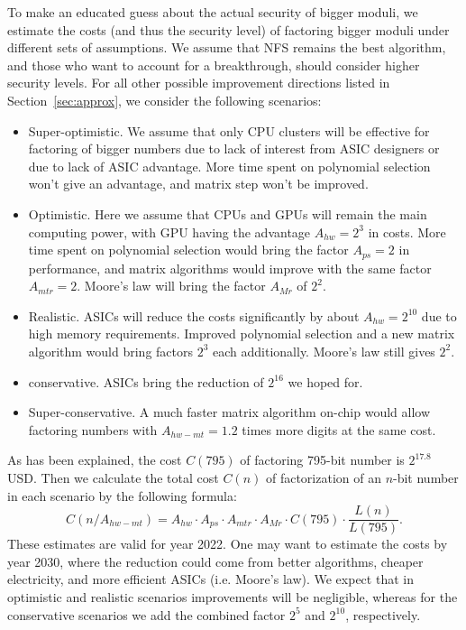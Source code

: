 \documentclass[a4paper]{article}
\begin{document}
 To make an educated guess about the actual security of bigger moduli, we estimate the costs (and thus the security level) of factoring bigger moduli under different sets of assumptions. We assume that NFS remains the best algorithm, and those who want to account for a breakthrough, should consider higher security levels. For all other possible improvement directions listed in Section~\ref{sec:approx}, we consider the following scenarios:
\begin{itemize}
    \item Super-optimistic. We assume that only CPU clusters will be effective for factoring of bigger numbers due to lack of interest from ASIC designers or due to lack of ASIC advantage. More time spent on polynomial selection won't give an advantage, and matrix step won't be improved.
    \item Optimistic. Here we assume that CPUs and GPUs will remain the main computing power, with GPU having the advantage $A_{hw}=2^3$ in costs. More time spent on polynomial selection would bring the factor $A_{ps}=2$ in performance, and matrix algorithms would improve with the same factor $A_{mtr}=2$. Moore's law will bring the factor $A_{Mr}$ of $2^2$.
    \item Realistic. ASICs will reduce the costs significantly by about $A_{hw}=2^{10}$ due to high memory requirements. Improved polynomial selection and a new matrix algorithm would bring factors $2^3$ each additionally. Moore's law still gives $2^2$.
     \item conservative. ASICs bring the reduction of $2^{16}$ we hoped for.
     \item Super-conservative. A much faster matrix algorithm on-chip would allow factoring numbers with $A_{hw-mt}=1.2$ times more digits at the same cost.
 \end{itemize}

As has been explained, the cost $C(795)$ of factoring 795-bit number is $2^{17.8}$ USD.
Then we calculate the total cost $C(n)$ of factorization of an $n$-bit number in each scenario by the following formula:
\begin{equation}
    C(n/A_{hw-mt}) = A_{hw}\cdot A_{ps} \cdot A_{mtr} \cdot A_{Mr} \cdot C(795) \cdot \frac{L(n)}{L(795)}.
\end{equation}
These estimates are valid for year 2022. One may want to estimate the costs by year 2030, where the reduction could come from better algorithms, cheaper electricity, and more efficient ASICs (i.e. Moore's law). We expect that in optimistic and realistic scenarios improvements will be negligible, whereas for the conservative scenarios we add the combined factor $2^5$ and $2^{10}$, respectively.
 
\end{document}
